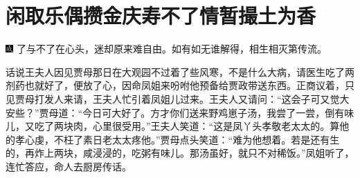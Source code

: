 

\chapter{闲取乐偶攒金庆寿\hspace{.5em}不了情暂撮土为香}


{\includegraphics[width=3mm]{../Images/00005} \kaishu 了与不了在心头，迷却原来难自由。如有如无谁解得，相生相灭第传流。}

话说王夫人因见贾母那日在大观园不过着了些风寒，不是什么大病，请医生吃了两剂药也就好了，便放了心，因命凤姐来吩咐他预备给贾政带送东西。正商议着，只见贾母打发人来请，王夫人忙引着凤姐儿过来。王夫人又请问：``这会子可又觉大安些？''贾母道：``今日可大好了。方才你们送来野鸡崽子汤，我尝了一尝，倒有味儿，又吃了两块肉，心里很受用。''王夫人笑道：``这是凤丫头孝敬老太太的。算他的孝心虔，不枉了素日老太太疼他。''贾母点头笑道：``难为他想着。若是还有生的，再炸上两块，咸浸浸的，吃粥有味儿。那汤虽好，就只不对稀饭。''凤姐听了，连忙答应，命人去厨房传话。

